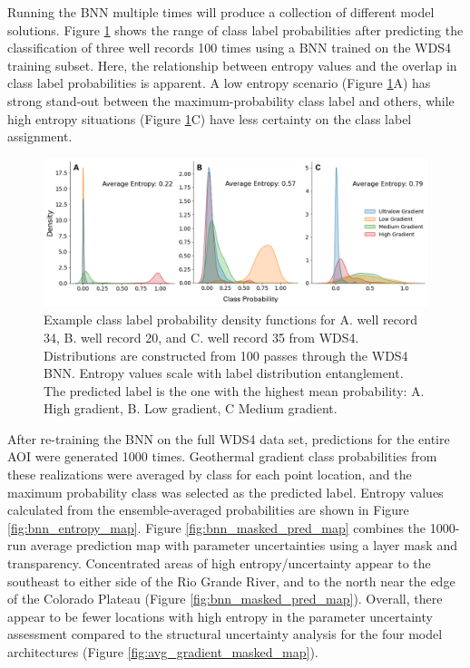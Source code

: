 Running the BNN multiple times will produce a collection of different model solutions. Figure \ref{fig:bnn_class_pdfs} shows the range of class label probabilities after predicting the classification of three well records 100 times using a BNN trained on the WDS4 training subset. Here, the relationship between entropy values and the overlap in class label probabilities is apparent. A low entropy scenario (Figure \ref{fig:bnn_class_pdfs}A) has strong stand-out between the maximum-probability class label and others, while high entropy situations (Figure \ref{fig:bnn_class_pdfs}C) have less certainty on the class label assignment.

\begin{figure}%
\centering
\includegraphics[width=\textwidth]{templates/images/Figure-BNN_100trials_WDS4.png}
\caption[Bayesian neural network class PDFs]{Example class label probability density functions for A. well record 34, B. well record 20, and C. well record 35 from WDS4. Distributions are constructed from 100 passes through the WDS4 BNN. Entropy values scale with label distribution entanglement. The predicted label is the one with the highest mean probability: A. High gradient, B. Low gradient, C Medium gradient.}
\label{fig:bnn_class_pdfs}
\end{figure}

After re-training the BNN on the full WDS4 data set, predictions for the entire AOI were generated 1000 times. Geothermal gradient class probabilities from these realizations were averaged by class for each point location, and the maximum probability class was selected as the predicted label. Entropy values calculated from the ensemble-averaged probabilities are shown in Figure \ref{fig:bnn_entropy_map}. Figure \ref{fig:bnn_masked_pred_map} combines the 1000-run average prediction map with parameter uncertainties using a layer mask and transparency. Concentrated areas of high entropy/uncertainty appear to the southeast to either side of the Rio Grande River, and to the north near the edge of the Colorado Plateau (Figure \ref{fig:bnn_masked_pred_map}). Overall, there appear to be fewer locations with high entropy in the parameter uncertainty assessment compared to the structural uncertainty analysis for the four model architectures (Figure \ref{fig:avg_gradient_masked_map}).

